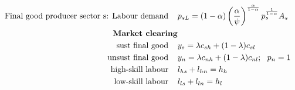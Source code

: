 \begin{align}
\\
%
\text{Final good producer sector s: Labour demand}\hspace{4mm}&
p_{sL} =%
(1-\alpha)\left(\frac{\alpha}{\psi}\right)^\frac{\alpha}{1- \alpha}p_s^\frac{1}{1-\alpha}A_s\label{mod:psl}
\\
%
\text{\textbf{Market clearing}}& \nonumber\\
\text{sust final good}\hspace{4mm}& y_s=\lambda c_{sh}+(1-\lambda) c_{sl}\label{mod:sus_market}\\
\text{unsust final good}\hspace{4mm}& y_n=\lambda c_{nh}+(1-\lambda) c_{nl};\ \  p_n=1\label{mod:unsus_market}\\
\text{high-skill labour}\hspace{4mm}& l_{hs}+l_{hn}=h_h\label{mod:hh_market}\\
\text{low-skill labour}\hspace{4mm}&l_{ls}+l_{ln}=h_l\label{mod:hl_market}
\end{align}

\newpage 


